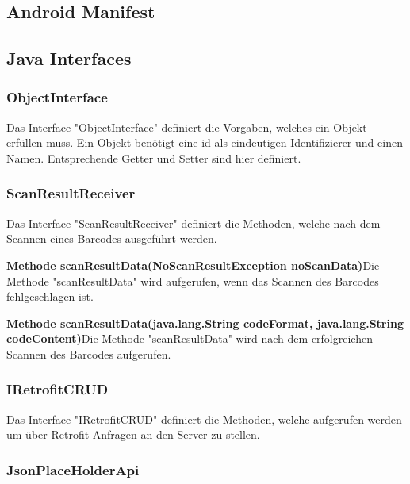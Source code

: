 \documentclass{scrartcl}
\begin{document}
\subsection{Android Manifest}

\subsection{Java Interfaces}

\subsubsection{ObjectInterface}

Das Interface "ObjectInterface" definiert die Vorgaben, welches ein Objekt erfüllen muss. Ein Objekt benötigt eine id als eindeutigen Identifizierer und einen Namen. Entsprechende Getter und Setter sind hier definiert.

\subsubsection{ScanResultReceiver}

Das Interface "ScanResultReceiver" definiert die Methoden, welche nach dem Scannen eines Barcodes ausgeführt werden. \newline

\noindent\textbf{Methode scanResultData(NoScanResultException noScanData)}\newline Die Methode "scanResultData" wird aufgerufen, wenn das Scannen des Barcodes fehlgeschlagen ist.\newline

\noindent\textbf{Methode scanResultData(java.lang.String codeFormat, java.lang.String codeContent)}\newline Die Methode "scanResultData" wird nach dem erfolgreichen Scannen des Barcodes aufgerufen.

\subsubsection{IRetrofitCRUD}

Das Interface "IRetrofitCRUD" definiert die Methoden, welche aufgerufen werden um über Retrofit Anfragen an den Server zu stellen.

\subsubsection{JsonPlaceHolderApi}
\end{document}

